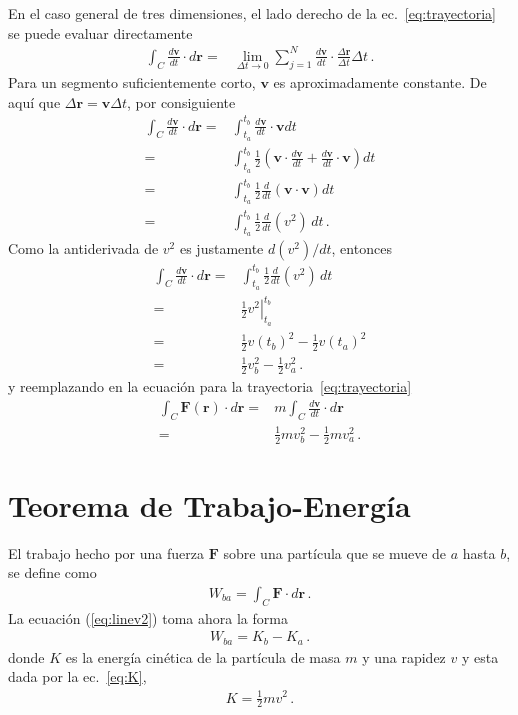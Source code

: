 En el caso general de tres dimensiones, el lado derecho de la ec.~\eqref{eq:trayectoria} se puede evaluar directamente
\begin{align}
  \int_C\frac{d\mathbf{v}}{dt}\cdot d\mathbf{r}
 =&\lim_{\Delta t\to 0}\sum_{j=1}^N\frac{d\mathbf{v}}{dt}\cdot\frac{\Delta\mathbf{r}}{\Delta t}\Delta t\,.
\end{align}
Para un segmento suficientemente corto, $\mathbf{v}$ es aproximadamente constante. De aquí que $\Delta\mathbf{r}=\mathbf{v}\Delta t$, por consiguiente
\begin{align}
    \int_C\frac{d\mathbf{v}}{dt}\cdot d\mathbf{r}
    =&\int_{t_a}^{t_b}\frac{d\mathbf{v}}{dt}\cdot\mathbf{v}dt\nonumber\\
    =&\int_{t_a}^{t_b}\frac{1}{2}\left(\mathbf{v}\cdot\frac{d\mathbf{v}}{dt}+\frac{d\mathbf{v}}{dt}\cdot\mathbf{v}\right)dt\nonumber\\
    =&\int_{t_a}^{t_b}\frac{1}{2}\frac{d}{dt}\left(\mathbf{v}\cdot\mathbf{v}\right)dt\nonumber\\
    =&\int_{t_a}^{t_b}\frac{1}{2}\frac{d}{dt}(v^2)\,dt\,.
\end{align}
Como la antiderivada de $v^2$ es justamente $d(v^2)/dt$, entonces
\begin{align}
  \int_C\frac{d\mathbf{v}}{dt}\cdot d\mathbf{r}
  =&\int_{t_a}^{t_b}\frac{1}{2}\frac{d}{dt}(v^2)\,dt\nonumber\\
  =&\left.\frac{1}{2}v^2\right|_{t_a}^{t_b}\nonumber\\
  =&\tfrac{1}{2}v(t_b)^2-\tfrac{1}{2}v(t_a)^2\nonumber\\
  =&\tfrac{1}{2}v_b^2-\tfrac{1}{2}v_a^2\,.
\end{align}
y reemplazando en la ecuación para la trayectoria~\eqref{eq:trayectoria}
\begin{align}
  \label{eq:linev2}
    \int_C\mathbf{F}(\mathbf{r})\cdot d\mathbf{r}=&m\int_C\frac{d\mathbf{v}}{dt}\cdot d\mathbf{r}\nonumber\\
  =&\tfrac{1}{2}mv_b^2-\tfrac{1}{2}mv_a^2\,.
\end{align}

\section{Teorema de Trabajo-Energía}
El trabajo hecho por una fuerza $\mathbf{F}$ sobre una partícula que se mueve de $a$ hasta $b$, se define como
\begin{align}
  W_{ba}=\int_C\mathbf{F}\cdot d\mathbf{r}\,.
\end{align}
La ecuación (\ref{eq:linev2}) toma ahora la forma
\begin{align}
  \label{eq:tte}
  W_{ba}=K_b-K_a\,.
\end{align}
donde $K$ es la energía cinética de la partícula de masa $m$ y una rapidez $v$ y esta dada por la ec.~\eqref{eq:K},
\begin{align*}
  K=\tfrac{1}{2}m v^2\,.
\end{align*}



